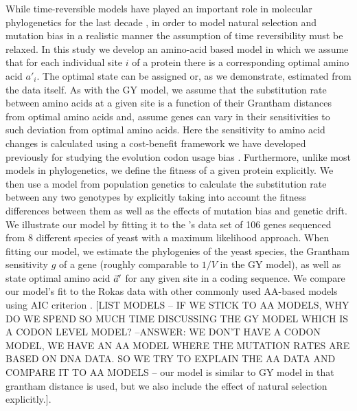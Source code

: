 While time-reversible models have played an important role in molecular phylogenetics for the last decade \citep{tavare1986},  in order to model natural selection and mutation bias in a realistic manner the assumption of time reversibility must be relaxed.
In this study we develop an amino-acid based model in which we assume that for each individual site $i$ of a protein there is a corresponding optimal amino acid $a'_i$.
The optimal state can be assigned or, as we demonstrate, estimated from the data itself.
As with the GY model, we assume that the substitution rate between amino acids at a given site is a function of their Grantham distances from optimal amino acids and, assume genes can vary in their sensitivities to such deviation from optimal amino acids.
Here the sensitivity to amino acid changes is calculated using a cost-benefit framework we have developed previously for studying the evolution codon usage bias \citep{Gilchrist2007, gilchrist2009genetics,ShahGilchrist2011pnas}.
Furthermore, unlike most models in phylogenetics, we define the fitness of a given protein explicitly.
We then use a model from population genetics to calculate the substitution rate between any two genotypes by explicitly taking into account the fitness differences between them as well as the effects of mutation bias and genetic drift.
We illustrate our model by fitting it to the \citet{rokas2003nature}'s data set of 106 genes sequenced from 8 different species of yeast with a maximum likelihood approach.
When fitting our model, we estimate the phylogenies of the yeast species, the Grantham sensitivity $g$ of a gene (roughly comparable to $1/V$ in the GY model), as well as state optimal amino acid $\vec{a}^\prime$ for any given site in a coding sequence.
We compare our model's fit to the Rokas data with other commonly used AA-based models using AIC criterion \citep{akaike1973information, akaike1974new, akaike1981likelihood}. [LIST MODELS -- IF WE STICK TO AA MODELS, WHY DO WE SPEND SO MUCH TIME DISCUSSING THE GY MODEL WHICH IS A CODON LEVEL MODEL? --ANSWER: WE DON'T HAVE A CODON MODEL, WE HAVE AN AA MODEL WHERE THE MUTATION RATES ARE BASED ON DNA DATA. SO WE TRY TO EXPLAIN THE AA DATA AND COMPARE IT TO AA MODELS -- {\color{blue} our model is similar to GY model in that grantham distance is used, but we also include the effect of natural selection explicitly.}].

